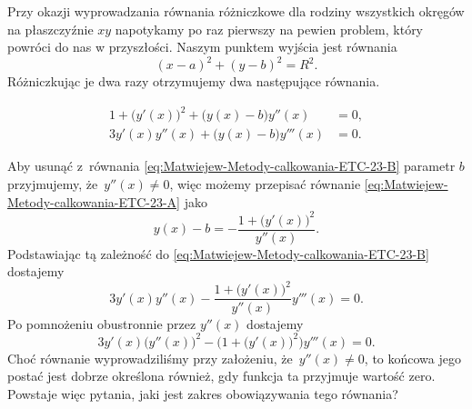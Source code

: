 \documentclass[a4paper,11pt]{article}
\numberwithin{equation}{section}
\begin{document}
\noindent
{} Przy okazji wyprowadzania równania różniczkowe dla rodziny
wszystkich okręgów na płaszczyźnie $xy$ napotykamy po raz pierwszy na
pewien problem, który powróci do nas w przyszłości. Naszym punktem wyjścia
jest równania
\begin{equation}
  \label{eq:Uwagi-do-konkrentych-stron-01}
  ( x - a )^{ 2 } + ( y - b )^{ 2 } = R^{ 2 }.
\end{equation}
Różniczkując je dwa razy otrzymujemy dwa następujące równania.

\negVerSpaceFour


\begin{subequations}

  \begin{align}
    \label{eq:Uwagi-do-konkrentych-stron-02-A}
    1 + \big( y'( x ) \big)^{ 2 } + \big( y( x ) - b \big) y''( x )
    &= 0, \\
    \label{eq:Uwagi-do-konkrentych-stron-02-B}
    3 y'( x ) y''( x ) + \big( y( x ) - b \big) y'''( x )
    &= 0.
  \end{align}

\end{subequations}


\noindent
Aby usunąć z~równania \eqref{eq:Matwiejew-Metody-calkowania-ETC-23-B}
parametr $b$ przyjmujemy, że~$y''( x ) \neq 0$, więc możemy przepisać równanie
\eqref{eq:Matwiejew-Metody-calkowania-ETC-23-A} jako
\begin{equation}
  \label{eq:Uwagi-do-konkrentych-stron-03}
  y( x ) - b =
  -\frac{ 1 + \big( y'( x ) \big)^{ 2 } }{ y''( x ) }.
\end{equation}
Podstawiając tą zależność do \eqref{eq:Matwiejew-Metody-calkowania-ETC-23-B}
dostajemy
\begin{equation}
  \label{eq:Uwagi-do-konkrentych-stron-04}
  3 y'( x ) y''( x ) -
  \frac{ 1 + \big( y'( x ) \big)^{ 2 } }{ y''( x ) } y'''( x ) = 0.
\end{equation}
Po pomnożeniu obustronnie przez $y''( x )$ dostajemy
\begin{equation}
  \label{eq:Uwagi-do-konkrentych-stron-05}
  3 y'( x ) \big( y''( x ) \big)^{ 2 } -
  \Big( 1 + \big( y'( x ) \big)^{ 2 } \Big) y'''( x ) = 0.
\end{equation}
Choć równanie wyprowadziliśmy przy założeniu, że~$y''( x ) \neq 0$, to końcowa
jego postać jest dobrze określona również, gdy funkcja ta przyjmuje wartość
zero. Powstaje więc pytania, jaki jest zakres obowiązywania tego równania?
\end{document}
